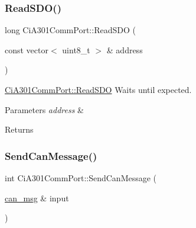 \mbox{\label{classCiA301CommPort_a3f74ce5899b30731322dabd352ccdc55}} 
\subsubsection{\texorpdfstring{Read\+S\+D\+O()}{ReadSDO()}\hspace{0.1cm}{\footnotesize\ttfamily [2/2]}}
{\footnotesize\ttfamily long Ci\+A301\+Comm\+Port\+::\+Read\+S\+DO (\begin{DoxyParamCaption}\item[{const vector$<$ uint8\+\_\+t $>$ \&}]{address }\end{DoxyParamCaption})}



\hyperlink{classCiA301CommPort_a0fd0920052684589bc37bb898dcdd758}{Ci\+A301\+Comm\+Port\+::\+Read\+S\+DO} Waits until expected. 


\begin{DoxyParams}{Parameters}
{\em address} & \\
\hline
\end{DoxyParams}
\begin{DoxyReturn}{Returns}

\end{DoxyReturn}
\mbox{\label{classCiA301CommPort_a700a04da67928ca50744617ece28cde5}} 
\subsubsection{\texorpdfstring{Send\+Can\+Message()}{SendCanMessage()}}
{\footnotesize\ttfamily int Ci\+A301\+Comm\+Port\+::\+Send\+Can\+Message (\begin{DoxyParamCaption}\item[{\hyperlink{structcan__msg}{can\+\_\+msg} \&}]{input }\end{DoxyParamCaption})\hspace{0.3cm}{\ttfamily [private]}}

\mbox{\label{classCiA301CommPort_aeae04455e1e1a1ca1beed9478372c031}} 
